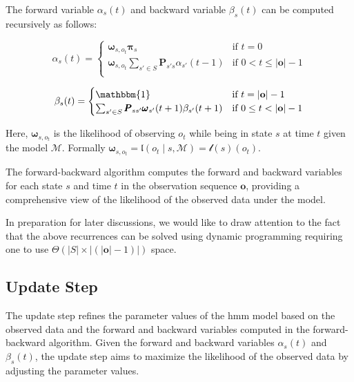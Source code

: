 The forward variable $\alpha_s(t)$ and backward variable $\beta_s(t)$ can be computed recursively as follows:

\begin{equation}
    \alpha_s(t) =
    \begin{cases}
        \pmb{\omega}_{s, o_t} \pmb{\pi}_s & \text{if } t = 0 \\
        \pmb{\omega}_{s, o_t} \sum_{s' \in S} \pmb{P}_{s's}\alpha_{s'}(t - 1) & \text{if } 0 < t \leq |\mathbf{o}| - 1 \\
    \end{cases}
    \label{eq:forward-recursive}
\end{equation}


\begin{equation}
    \beta_s(t) =
    \begin{cases}
        \mathbbm{1} & \text{if } t = |\mathbf{o}| - 1 \\
        \sum_{s' \in S} \pmb{P}_{ss'} \pmb{\omega}_{s'}(t + 1) \beta_{s'}(t + 1) & \text{if } 0 \leq t < |\mathbf{o}| - 1 \\
    \end{cases}
    \label{eq:backward-recursive}
\end{equation}


Here, $\pmb{\omega}_{s, o_t}$ is the likelihood of observing $o_t$ while being in state $s$ at time $t$ given the model $\mathcal{M}$.
Formally $\pmb{\omega}_{s, o_t} = \mathfrak{l}(o_t \mid s, \mathcal{M}) = \mathscr{l}(s)(o_t)$.

The forward-backward algorithm computes the forward and backward variables for each state $s$ and time $t$ in the observation sequence $\mathbf{o}$, providing a comprehensive view of the likelihood of the observed data under the model.

In preparation for later discussions, we would like to draw attention to the fact that the above recurrences can be solved using dynamic programming requiring one to use $\Theta(|S|\times|(|\mathbf{o}|-1)|)$ space.

\subsection{Update Step}\label{subsec:update-algorithm}
The update step refines the parameter values of the \gls{hmm} model based on the observed data and the forward and backward variables computed in the forward-backward algorithm.
Given the forward and backward variables $\alpha_s(t)$ and $\beta_s(t)$, the update step aims to maximize the likelihood of the observed data by adjusting the parameter values.

